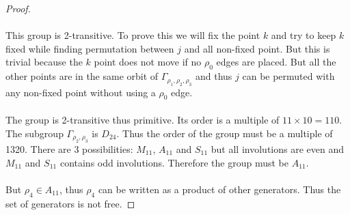 \begin{proof}
\begin{figure}[H]
\begin{center}
    \caption{}
  \end{center}
\end{figure}

\paragraph{}
This group is 2-transitive. To prove this we will fix the point $k$ and try to keep $k$ fixed while finding permutation between $j$ and all non-fixed point. But this is trivial because the $k$ point does not move if no $\rho_0$ edges are placed. But all the other points are in the same orbit of $\Gamma_{\rho_1, \rho_2, \rho_3}$ and thus $j$ can be permuted with any non-fixed point without using a $\rho_0$ edge.

\paragraph{}
The group is 2-transitive thus primitive. Its order is a multiple of $11 \times 10 = 110$. The subgroup $\Gamma_{\rho_2, \rho_3}$ is $D_{24}$. Thus the order of the group must be a multiple of 1320. There are 3 possibilities: $M_{11}$, $A_{11}$ and $S_{11}$ but all involutions are even and $M_{11}$ and $S_{11}$ contains odd involutions. Therefore the group must be $A_{11}$.

\paragraph{}
But $\rho_4 \in A_{11}$, thus $\rho_4$ can be written as a product of other generators. Thus the set of generators is not free.


\end{proof}
